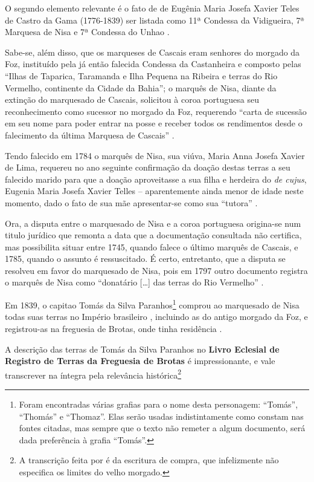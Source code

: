 O segundo elemento relevante é o fato de de Eugênia Maria Josefa Xavier Teles de Castro da Gama (1776-1839) ser listada como 11ª Condessa da Vidigueira, 7ª Marquesa de Nisa e 7ª Condessa do Unhao \cite{wiki_nisa_2015}. 

Sabe-se, além disso, que os marqueses de Cascais eram senhores do morgado da Foz, instituído pela já então falecida Condessa da Castanheira e composto pelas ``Ilhas de Taparica, Taramanda e Ilha Pequena na Ribeira e terras do Rio Vermelho, continente da Cidade da Bahia''; o marquês de Nisa, diante da extinção do marquesado de Cascais, solicitou à coroa portuguesa seu reconhecimento como sucessor no morgado da Foz, requerendo ``carta de sucessão em seu nome para poder entrar na posse e receber todos os rendimentos desde o falecimento da última Marquesa de Cascais'' \cite[p.~592]{castralmeida_ultramar_1910}. 

Tendo falecido em 1784 o marquês de Nisa, sua viúva, Maria Anna Josefa Xavier de Lima, requereu no ano seguinte confirmação da doação destas terras a seu falecido marido para que a doação aproveitasse a sua filha e herdeira do \textit{de cujus}, Eugenia Maria Josefa Xavier Telles -- aparentemente ainda menor de idade neste momento, dado o fato de sua mãe apresentar-se como sua ``tutora'' \cite[p.~592]{castralmeida_ultramar_1910}. 

Ora, a disputa entre o marquesado de Nisa e a coroa portuguesa origina-se num titulo jurídico que remonta a data que a documentação consultada não certifica, mas possibilita situar entre 1745, quando falece o último marquês de Cascais, e 1785, quando o assunto é ressuscitado. É certo, entretanto, que a disputa se resolveu em favor do marquesado de Nisa, pois em 1797 outro documento registra o marquês de Nisa como ``donatário [\dots] das terras do Rio Vermelho'' \cite[p.~543]{ramiz_expos_1881}.

Em 1839, o capitao Tomás da Silva Paranhos\footnote{Foram encontradas várias grafias para o nome desta personagem: ``Tomás'', ``Thomás'' e ``Thomaz''. Elas serão usadas indistintamente como constam nas fontes citadas, mas sempre que o texto não remeter a algum documento, será dada preferência à grafia ``Tomás''.} comprou ao marquesado de Nisa todas suas terras no Império brasileiro \cite[pp.~III-7 - III-12]{teixeira_doacoes_1978}, incluindo as do antigo morgado da Foz, e registrou-as na freguesia de Brotas, onde tinha residência \cite[p.~10]{ott_engenhos_1996}. 

A descrição das terras de Tomás da Silva Paranhos no \textbf{Livro Eclesial de Registro de Terras da Freguesia de Brotas} é impressionante, e vale transcrever na íntegra pela relevância histórica\footnote{A transcrição feita por  é da escritura de compra, que infelizmente não especifica os limites do velho morgado.}

